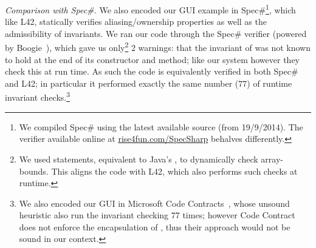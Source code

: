 

\textit{Comparison with Spec\#.}
We also encoded our GUI example in Spec\#\footnote{We compiled Spec\# using the latest available source (from 19/9/2014). The verifier available online at \url{rise4fun.com/SpecSharp} behalves differently.}, which like L42, statically verifies aliasing/ownership properties as well as the admissibility of invariants.
We ran our code through the Spec\# verifier (powered by Boogie~\cite{DBLP:conf/fmco/BarnettCDJL05}), which gave us only\footnote{We used \Q@assume@ statements, equivalent to Java's \Q@assert@, to dynamically check array-bounds.%
This aligns the code with L42, which also performs such checks at runtime.} $2$ warnings: that the invariant of \Q@SafeMovable@ was not known to hold at the end of its constructor and \Q@dispatch@ method; like our system however they check this at run time. As such the code is equivalently verified in both Spec\# and L42; in particular it performed exactly the same number ($77$) of runtime invariant checks.\footnote{
We also encoded our GUI in Microsoft Code Contracts~\cite{DBLP:conf/sac/FahndrichBL10}, whose unsound heuristic also run the invariant checking $77$ times; however Code Contract does not enforce the
encapsulation of \Q@children@, thus their approach would not be sound in our context.}


